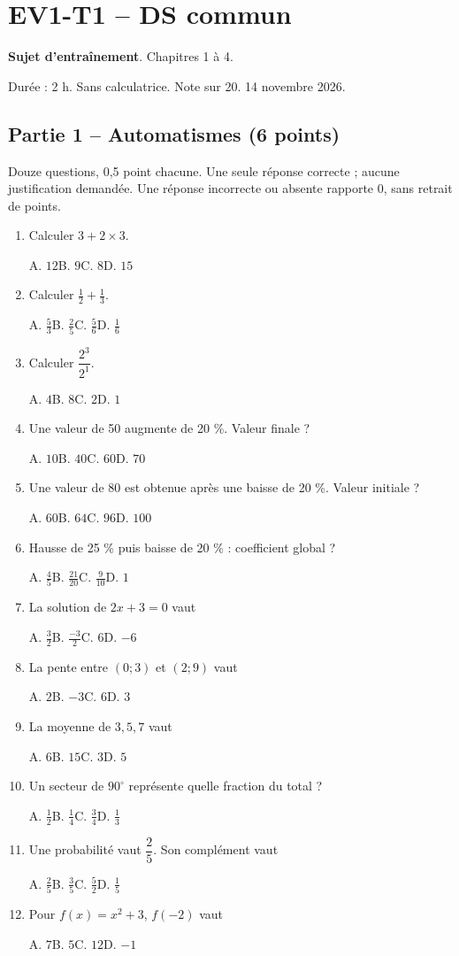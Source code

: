 \clearpage\section*{EV1-T1 -- DS commun}\label{EV1-T1}
\textbf{Sujet d’entraînement}. Chapitres 1 à 4.\par Durée : 2 h. Sans calculatrice. Note sur 20. 14 novembre 2026.
\subsection*{Partie 1 -- Automatismes (6 points)}
Douze questions, 0,5 point chacune. Une seule réponse correcte ; aucune justification demandée. Une réponse incorrecte ou absente rapporte 0, sans retrait de points.
\begin{enumerate}
\item Calculer $3+2\times3$.\par A. $12$\quad B. $9$\quad C. $8$\quad D. $15$
\item Calculer $\frac12+\frac13$.\par A. $\frac{5}{3}$\quad B. $\frac{2}{5}$\quad C. $\frac{5}{6}$\quad D. $\frac{1}{6}$
\item Calculer $\dfrac{2^3}{2^{1}}$.\par A. $4$\quad B. $8$\quad C. $2$\quad D. $1$
\item Une valeur de 50 augmente de 20 \%. Valeur finale ?\par A. $10$\quad B. $40$\quad C. $60$\quad D. $70$
\item Une valeur de 80 est obtenue après une baisse de 20 \%. Valeur initiale ?\par A. $60$\quad B. $64$\quad C. $96$\quad D. $100$
\item Hausse de 25 \% puis baisse de 20 \% : coefficient global ?\par A. $\frac{4}{5}$\quad B. $\frac{21}{20}$\quad C. $\frac{9}{10}$\quad D. $1$
\item La solution de $2x+3=0$ vaut\par A. $\frac{3}{2}$\quad B. $\frac{-3}{2}$\quad C. $6$\quad D. $-6$
\item La pente entre $(0;3)$ et $(2;9)$ vaut\par A. $2$\quad B. $-3$\quad C. $6$\quad D. $3$
\item La moyenne de $3, 5, 7$ vaut\par A. $6$\quad B. $15$\quad C. $3$\quad D. $5$
\item Un secteur de $90^\circ$ représente quelle fraction du total ?\par A. $\frac{1}{2}$\quad B. $\frac{1}{4}$\quad C. $\frac{3}{4}$\quad D. $\frac{1}{3}$
\item Une probabilité vaut $\dfrac{2}{5}$. Son complément vaut\par A. $\frac{2}{5}$\quad B. $\frac{3}{5}$\quad C. $\frac{5}{2}$\quad D. $\frac{1}{5}$
\item Pour $f(x)=x^2+3$, $f(-2)$ vaut\par A. $7$\quad B. $5$\quad C. $12$\quad D. $-1$
\end{enumerate}
